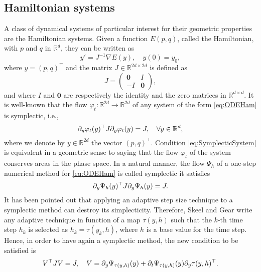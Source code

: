 \documentclass{siamart1116}
\numberwithin{theorem}{section}
\renewcommand{\phi}{\varphi}
\newcommand{\pdv}[2]{\ensuremath\partial_{#2}#1}
\newcommand{\R}{\mathbb{R}}
\begin{document}
\subsection{Hamiltonian systems} A class of dynamical systems of particular interest for their geometric properties are the Hamiltonian systems. Given a function $E(p, q)$, called the Hamiltonian, with $p$ and $q$ in $\R^d$, they can be written as
\begin{equation}\label{eq:ODEHam}
y' = J^{-1}\nabla E(y), \quad y(0) = y_0,
\end{equation}
where $y = (p, q)^\top$ and the matrix $J\in\R^{2d \times 2d}$ is defined as
\begin{equation}
J = \begin{pmatrix} \mathbf{0} & I \\ -I & \mathbf{0} \end{pmatrix},
\end{equation}
and where $I$ and $\mathbf{0}$ are respectively the identity and the zero matrices in $\R^{d\times d}$. It is well-known that the flow $\phi_t\colon\R^{2d}\to\R^{2d}$ of any system of the form \eqref{eq:ODEHam} is symplectic, i.e., 
\begin{equation}\label{eq:SymplecticSystem}
\pdv{\phi_t(y)}{y}^\top J \pdv{\phi_t(y)}{y} = J, \quad \forall y \in \R^d,
\end{equation}
where we denote by $y\in \R^{2d}$ the vector $(p, q)^\top$. Condition \eqref{eq:SymplecticSystem} is equivalent in a geometric sense to saying that the flow $\phi_t$ of the system conserves areas in the phase space. In a natural manner, the flow $\Psi_h$ of a one-step numerical method for \eqref{eq:ODEHam} is called symplectic it satisfies
\begin{equation}\label{eq:SymplecticMethod}
\pdv{\Psi_h(y)}{y}^\top J \pdv{\Psi_h(y)}{y} = J.
\end{equation}
It has been pointed out \cite{SkG92, HLW06} that applying an adaptive step size technique to a symplectic method can destroy its simplecticity. Therefore, Skeel and Gear \cite{SkG92} write any adaptive technique in function of a map $\tau(y, h)$ such that the $k$-th time step $h_k$ is selected as $h_k = \tau(y_k, h)$, where $h$ is a base value for the time step. Hence, in order to have again a symplectic method, the new condition to be satisfied is
\begin{equation}
V^\top J V = J, \quad V = \pdv{\Psi_{\tau(y, h)}(y)}{y} + \pdv{\Psi_{\tau(y, h)}(y)}{t}\pdv{\tau(y, h)}{y}^\top.
\end{equation}
\end{document}
